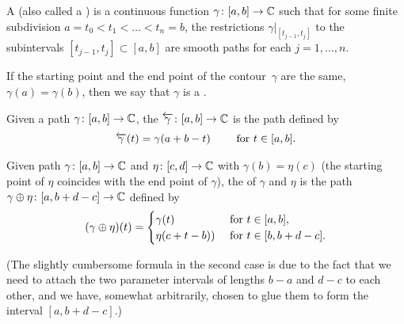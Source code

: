 \begin{definition}
  \label{def:contour}
  A  (also called a )
  is a continuous function $\gamma \colon [a,b] \to \mathbb{C}$
  such that for some finite subdivision $a = t_0 < t_1 < \ldots < t_n = b$,
  the restrictions $\gamma|_{[t_{j-1},t_j]}$
  to the subintervals $[t_{j-1},t_j] \subset [a,b]$
  are smooth paths for each $j = 1, \ldots, n$.

  If the starting point and the end point of the contour~$\gamma$ are the same,
  $\gamma(a) = \gamma(b)$, then we say that $\gamma$ is a .
\end{definition}

\begin{definition}
  \label{def:reverse_path}
  Given a path $\gamma \colon [a,b] \to \mathbb{C}$,
  the  $\overleftarrow{\gamma} \colon [a,b] \to \mathbb{C}$
  is the path defined by
  \begin{align*}
    \overleftarrow{\gamma}(t) = \gamma(a+b-t) \qquad \text{ for } t \in [a,b] .
  \end{align*}
\end{definition}

\begin{definition}
  \label{def:path_concatenation}
  Given path $\gamma \colon [a,b] \to \mathbb{C}$ and
  $\eta \colon [c,d] \to \mathbb{C}$ with $\gamma(b) = \eta(c)$
  (the starting point of $\eta$ coincides with the end point of $\gamma$),
  the  of $\gamma$ and $\eta$ is the path
  $\gamma \oplus \eta \colon [a,b+d-c] \to \mathbb{C}$ defined by
  \begin{align*}
    (\gamma \oplus \eta)(t) =
    \begin{cases}
      \gamma(t) & \text{ for } t \in [a,b] , \\
      \eta(c+t-b)) & \text{ for } t \in [b,b+d-c] .
    \end{cases}
  \end{align*}

  (The slightly cumbersome formula in the second case is due to the fact
  that we need to attach the two parameter intervals of lengths
  $b-a$ and $d-c$ to each other, and we have, somewhat arbitrarily,
  chosen to glue them to form the interval $[a,b+d-c]$.)
\end{definition}

